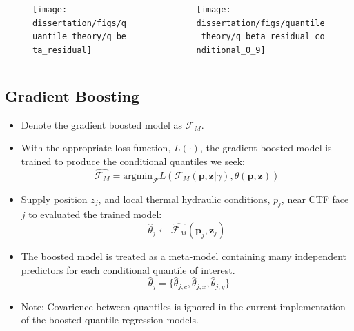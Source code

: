 \documentclass[t, pdftex]{beamer}
\begin{document}
\begin{frame}
{\begin{columns}
\begin{column}{0.5\textwidth}
\begin{figure}
                \centering
                \texttt{[image: dissertation/figs/quantile\_theory/q\_beta\_residual]}
            \end{figure}
        \end{column}
        \begin{column}{0.5\textwidth}  %
            \begin{figure}
                \centering
                \texttt{[image: dissertation/figs/quantile\_theory/q\_beta\_residual\_conditional\_0\_9]}
            \end{figure}
        \end{column}
    \end{columns}
}
\end{frame}

\subsection*{Gradient Boosting}
\begin{frame}
\vspace{-16pt}
\begin{itemize}
    \item Denote the gradient boosted model as $\mathcal F_M$.
    \item With the appropriate loss function, $L(\cdot)$, the gradient boosted model is trained to produce the conditional quantiles we seek:
    \[
     \hat{\mathcal F_M} =  \mathrm{argmin}_{\mathcal F}
     L(\mathcal{F}_M (\mathbf p, \mathbf z| \gamma), \theta(\mathbf p, \mathbf z)) 
    \]
    \item Supply position $z_j$, and local thermal hydraulic conditions, $p_j$, near CTF face $j$ to evaluated the trained model:
    \[
    \hat \theta_j \leftarrow \hat{\mathcal F_M}(\mathbf p_j, \mathbf z_j)
    \]
    \item  The boosted model is treated as a meta-model containing many independent predictors for each conditional quantile of interest.
    \[
    \ \ \hat \theta_j = \{\hat \theta_{j,c}, \hat \theta_{j,x}, \hat \theta_{j,y} \}
    \]
    \item Note: Covarience between quantiles is ignored in the current implementation of the boosted quantile regression models.
\end{itemize}
\end{frame}
\end{document}
